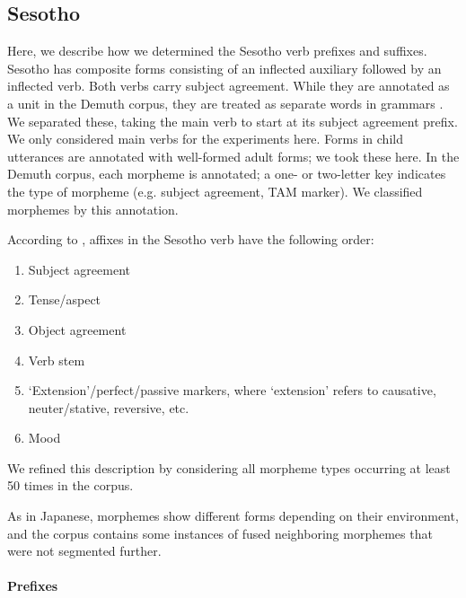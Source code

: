 \documentclass[11pt,letterpaper]{article}
\begin{document}





\subsection{Sesotho}

Here, we describe how we determined the Sesotho verb prefixes and suffixes.
Sesotho has composite forms consisting of an inflected auxiliary followed by an inflected verb.
Both verbs carry subject agreement.
While they are annotated as a unit in the Demuth corpus, they are treated as separate words in grammars \citep{doke1967textbook,guma1971outline}.
We separated these, taking the main verb to start at its subject agreement prefix.
We only considered main verbs for the experiments here.
Forms in child utterances are annotated with well-formed adult forms; we took these here.
In the Demuth corpus, each morpheme is annotated; a one- or two-letter key indicates the type of morpheme (e.g. subject agreement, TAM marker).
We classified morphemes by this annotation.


According to \cite{demuth1992acquisition}, affixes in the Sesotho verb have the following order:
\begin{enumerate}
    \item Subject agreement
    \item Tense/aspect
    \item Object agreement
    \item Verb stem
    \item `Extension'/perfect/passive markers, where `extension' refers to causative, neuter/stative, reversive, etc.
    \item Mood
\end{enumerate}
We refined this description by considering all morpheme types occurring at least 50 times in the corpus.

As in Japanese, morphemes show different forms depending on their environment, and the corpus contains some instances of fused neighboring morphemes that were not segmented further.


\paragraph{Prefixes}
\end{document}
